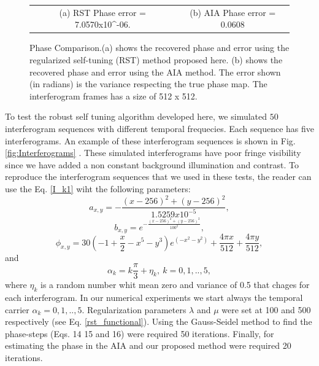 \documentclass[letterpaper,12pt]{article}   %
\begin{document}
\begin{figure}[ t]
\begin{center}
\begin{tabular}{c c}
			(a) RST Phase error =  7.0570x10^{-06}. & (b) AIA Phase error =  0.0608
		\end{tabular}
	\end{center}
	\caption{Phase Comparison.(a) shows the recovered phase and error using the
	regularized self-tuning (RST) method proposed here. (b)  shows the recovered phase
	and error using the AIA method. The error shown (in radians) is the variance
	respecting the true phase map. The interferogram frames has a size of 512 x 512.}
	\label{fig:phase}
\end{figure}
To test the robust self tuning algorithm developed here, we simulated $50$ interferogram
sequences with different temporal frequecies. Each sequence has five interferograms. An
example of these interferogram sequences is shown in Fig.\ref{fig:Interferograms} . These
simulated interferograms have poor fringe visibility since we have added a non constant
background illumination and contrast.  To reproduce the interferogram sequences that we
used in these tests, the reader can use the Eq. \ref{I_k1} wiht the following parameters:
\begin{equation}
	a_{x,y}=-\frac{(x-256)^2+(y-256)^2}{1.5259x10^{-5}},
\end{equation}
\begin{equation}
	b_{x,y}=e^{-\frac{(x-256)^2+(y-256)^2}{100^{2}}},
\end{equation}
\begin{equation}
	\phi_{x,y}= 30(-1+\frac{x}{2}-x^5-y^3) e^{(-x^2-y^2)}+\frac{4\pi x}{512}+\frac{4\pi
	 y}{512},
\end{equation}
and
\begin{equation}
	\alpha_k = k\frac{\pi}{3}+\eta_k,\: k=0,1,..,5,
\end{equation}
where $\eta_k$ is a random number whit mean zero and variance of 0.5 that chages for each
interferogram.
In our numerical experiments we start always the temporal carrier $\alpha_k=0,1,..,5$.
Regularization parameters $\lambda$ and $\mu$ were set at 100 and 500 respectively (see Eq.
\ref{rst_functional}). Using the Gauss-Seidel method to find the phase-steps (Eqs. 14 15
and 16) were required 50 iterations. Finally, for estimating the phase in the AIA and our
proposed method were required 20 iterations.
\end{document}
